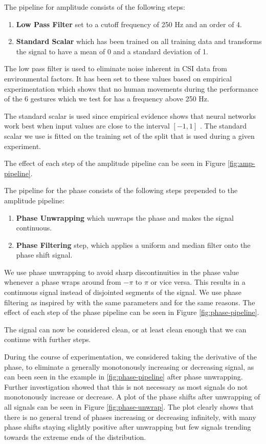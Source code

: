 The pipeline for amplitude consists of the following steps:

\begin{enumerate}
	\item \textbf{Low Pass Filter} set to a cutoff frequency of 250 Hz and an order of 4.
	\item \textbf{Standard Scalar} which has been trained on all training data and transforms the signal to have a mean of 0 and a standard deviation of 1.
\end{enumerate}

The low pass filter is used to eliminate noise inherent in CSI data from environmental factors.
It has been set to these values based on empirical experimentation which shows that no human movements during the performance of the 6 gestures which we test for has a frequency above 250 Hz.

The standard scalar is used since empirical evidence shows that neural networks work best when input values are close to the interval $[-1, 1]$ \cite{varun2023tuning}.
The standard scalar we use is fitted on the training set of the split that is used during a given experiment.

The effect of each step of the amplitude pipeline can be seen in Figure \ref{fig:amp-pipeline}.

The pipeline for the phase consists of the following steps prepended to the amplitude pipeline:
\begin{enumerate}
	\item \textbf{Phase Unwrapping} which unwraps the phase and makes the signal continuous.
	\item \textbf{Phase Filtering} step, which applies a uniform and median filter onto the phase shift signal.
\end{enumerate}

We use phase unwrapping to avoid sharp discontinuities in the phase value whenever a phase wraps around from $-\pi$ to $\pi$ or vice versa.
This results in a continuous signal instead of disjointed segments of the signal.
We use phase filtering as inspired by \cite{oerlemans2022effect} with the same parameters and for the same reasons.
The effect of each step of the phase pipeline can be seen in Figure \ref{fig:phase-pipeline}.

The signal can now be considered clean, or at least clean enough that we can continue with further steps.

During the course of experimentation, we considered taking the derivative of the phase, to eliminate a generally monotonously increasing or decreasing signal, as can been seen in the example in \ref{fig:phase-pipeline} after phase unwrapping.
Further investigation showed that this is not necessary as most signals do not monotonously increase or decrease.
A plot of the phase shifts after unwrapping of all signals can be seen in Figure \ref{fig:phase-unwrap}.
The plot clearly shows that there is no general trend of phases increasing or decreasing infinitely, with many phase shifts staying slightly positive after unwrapping but few signals trending towards the extreme ends of the distribution.


